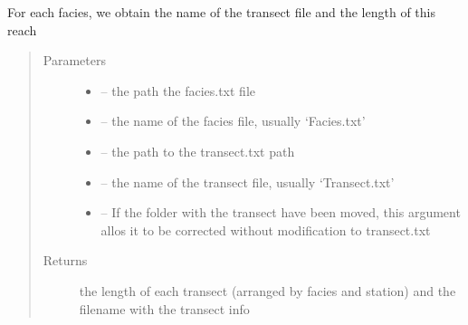 \documentclass[letterpaper,10pt,english]{sphinxmanual}
\begin{document}
\begin{fulllineitems}
\label{\detokenize{index:src.lammi.get_transect_filename}}
For each facies, we obtain the name of the transect file and the length of this reach
\begin{quote}\begin{description}
\item[{Parameters}] \leavevmode\begin{itemize}
\item {} 
 -- the path the facies.txt file

\item {} 
 -- the name of the facies file, usually `Facies.txt'

\item {} 
 -- the path to the transect.txt path

\item {} 
 -- the name of the transect file, usually `Transect.txt'

\item {} 
 -- If the folder with the transect have been moved, this argument allos it to be corrected without
modification to transect.txt

\end{itemize}

\item[{Returns}] \leavevmode
the length of each transect (arranged by facies and station) and the filename with the transect info

\end{description}\end{quote}

\end{fulllineitems}

\end{document}
